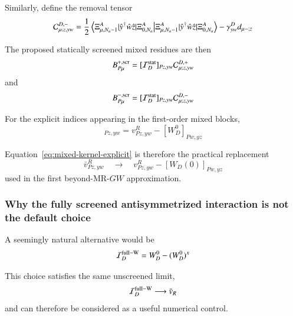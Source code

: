 \documentclass[aip,jcp,reprint,noshowkeys,superscriptaddress]{revtex4-1}
\begin{document}
Similarly, define the removal tensor
\begin{equation}
  \mathcal C_{\mu;z,yw}^{D,-}
  =
  \frac12
  \braket{
    \Xi_{\mu,N_a-1}^{A}
    |
    \hat y^\dagger\hat w\hat z
    |
    \Xi_{0,N_a}^{A}
  }
  -
  \gamma_{yw}^{D}
  d_{\mu-;z}
  \label{eq:connected-removal-tensor}
\end{equation}

The proposed statically screened mixed residues are then
\begin{equation}
  B^{+,{\rm scr}}_{P\mu}
  =
  [\mathcal I_D^{\rm stat}]_{Pz,yw}
  \mathcal C_{\mu;z,yw}^{D,+}
  \label{eq:Bplus-screened}
\end{equation}
and
\begin{equation}
  B^{-,{\rm scr}}_{P\mu}
  =
  [\mathcal I_D^{\rm stat}]_{Pz,yw}
  \mathcal C_{\mu;z,yw}^{D,-}
  \label{eq:Bminus-screened}
\end{equation}

For the explicit indices appearing in the first-order mixed blocks,
\begin{equation}
  [\mathcal I_D^{\rm stat}]_{Pz,yw}
  =
  v^R_{Pz,yw}
  -
  [W_D^0]_{Pw,yz}
  \label{eq:mixed-kernel-explicit}
\end{equation}

Equation~\eqref{eq:mixed-kernel-explicit} is therefore the practical
replacement
\begin{equation}
  \bar v^R_{Pz,yw}
  \quad\longrightarrow\quad
  v^R_{Pz,yw}
  -
  [W_D(0)]_{Pw,yz}
  \label{eq:screening-replacement}
\end{equation}
used in the first beyond-MR-$GW$ approximation.


\subsubsection{Why the fully screened antisymmetrized interaction is not
the default choice}

A seemingly natural alternative would be
\begin{equation}
  \mathcal I_D^{\rm full-W}
  =
  W_D^0-(W_D^0)^x
  \label{eq:full-W-alternative}
\end{equation}

This choice satisfies the same unscreened limit,
\begin{equation}
  \mathcal I_D^{\rm full-W}
  \longrightarrow
  \bar v_R
\end{equation}
and can therefore be considered as a useful numerical control.
\end{document}
